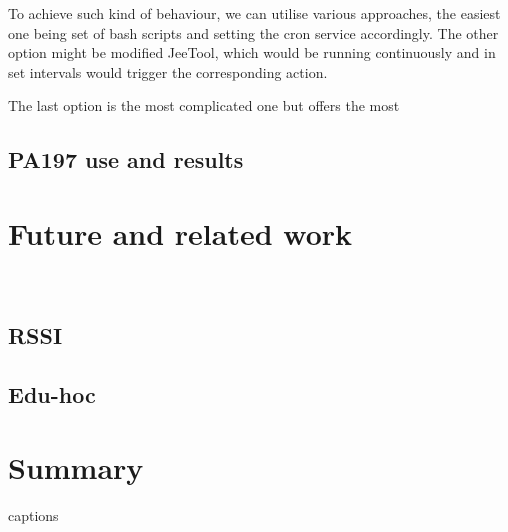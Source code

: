 \documentclass[
  print, %
  Table,   %
  nolof,     %
  nolot,     %
           oneside
]{fithesis3}
\begin{document}
  To achieve such kind of behaviour, we can utilise various approaches, the easiest one being set of bash scripts and setting the cron service %
  accordingly. The other option might be modified JeeTool, which would be running continuously and in set intervals would trigger the corresponding action.

  The last option is the most complicated one but offers the most

  \section{PA197 use and results} \label{sec:PA197}

\chapter{Future and related work}\
  \section{RSSI}
  \section{Edu-hoc}
\chapter{Summary}




{\csname captions\languagename\endcsname %
\makeatletter %
  \thesis@selectLocale{\thesis@locale}\makeatother
\printbibliography[heading=bibintoc]} %

\appendix %
\end{document}
